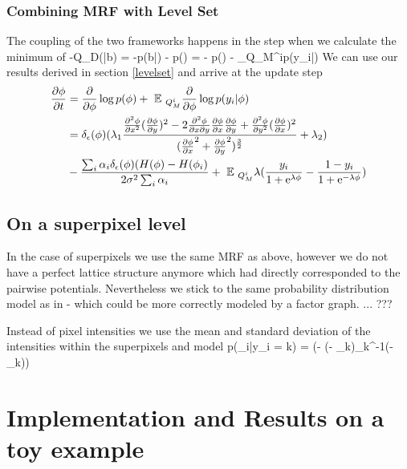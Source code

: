 \documentclass{article} %
\begin{document}
\subsubsection{Combining MRF with Level Set}
The coupling of the two frameworks happens in the step when we calculate the minimum of
\beqs
-\log Q_D(\phi|b) = -\log p(b|\phi) - \log p(\phi) = - \log p(\phi) - \EE_{Q_M^i}\log p(y_i|\phi)
\eeqs
We can use our results derived in section \ref{levelset} and arrive at the update step
\begin{align*}
\frac{\partial \phi}{\partial t} &= \frac{\partial}{\partial \phi} \log p(\phi) +\mbox{ }\mathbb{E}\mbox{ }_{Q_M^i} \frac{\partial}{\partial \phi} \log p(y_i|\phi)\\
&= \delta_{\epsilon}(\phi)(\lambda_1  \frac{ \frac{\partial^2 \phi}{\partial x^2} (\frac{\partial \phi}{\partial y})^2 - 2 \frac{\partial^2 \phi}{\partial x \partial y} \frac{\partial \phi}{\partial x}\frac{\partial \phi}{\partial y} +  \frac{\partial^2 \phi}{\partial y^2} (\frac{\partial \phi}{\partial x})^2}{(\frac{\partial \phi}{\partial x}^2  + \frac{\partial \phi}{\partial y}^2)^{\frac{3}{2}}} + \lambda_2) \\
&- \frac{\sum_i \alpha_i  \delta_{\epsilon}(\phi)(H(\phi)-H(\phi_i)}{2\sigma^2 \sum_i \alpha_i} + \mbox{ }\mathbb{E}\mbox{ }_{Q_M^i} \lambda(\frac{y_i}{1 +\mathrm{e}^{\lambda \phi}} - \frac{1-y_i}{1 + \mathrm{e}^{-\lambda \phi}})
\nonumber
\end{align*}


\subsection{On a superpixel level}
In the case of superpixels we use the same MRF as above, however we do not have a perfect lattice structure anymore which had directly corresponded to the pairwise potentials. Nevertheless we stick to the same probability distribution model as in - which could be more correctly modeled by a factor graph. ... ???

Instead of pixel intensities we use the mean and standard deviation of the intensities within the superpixels and model 
\beqs
p(\bx_i|y_i = k) =  \exp(- (\bx- \mathbf{\mu}_k)\Sigma_k^{-1}(\bx - \mathbf{\mu}_k))
\eeqs



\section{Implementation and Results on a toy example}
\end{document}
